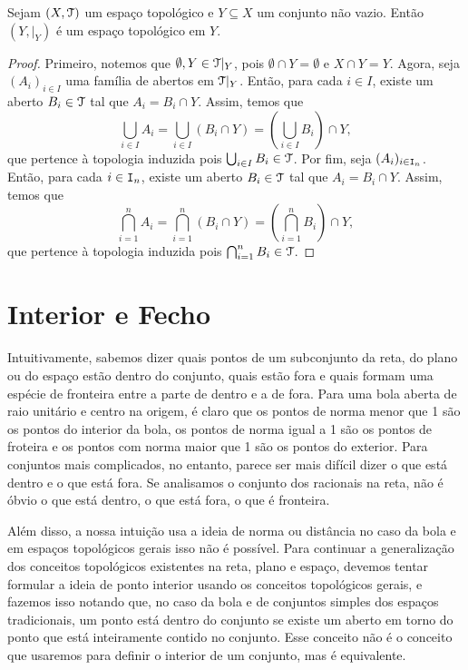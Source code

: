 \begin{prop}
	Sejam $(X,\mathcal{T})$ um espaço topológico e $Y \subseteq X$ um conjunto não vazio. Então $(Y,\mathcal|_Y)$ é um espaço topológico em $Y$.
\end{prop}
\begin{proof}
	Primeiro, notemos que $\emptyset,Y \in \mathcal{T}|_Y$, pois $\emptyset \cap Y = \emptyset$ e $X \cap Y = Y$. Agora, seja $(A_i)_{i \in I}$ uma família de abertos em $\mathcal{T}|_Y$. Então, para cada $i \in I$, existe um aberto $B_i \in \mathcal{T}$ tal que $A_i = B_i \cap Y$. Assim, temos que
	\begin{equation*}
	\bigcup_{i \in I} A_i = \bigcup_{i \in I} (B_i \cap Y) = \left( \bigcup_{i \in I} B_i \right) \cap Y,
	\end{equation*}
que pertence à topologia induzida pois $\bigcup_{i \in I} B_i \in \mathcal{T}$. Por fim, seja $(A_i)_{i \in \mathtt I_n}$. Então, para cada $i \in \mathtt I_n$, existe um aberto $B_i \in \mathcal{T}$ tal que $A_i = B_i \cap Y$. Assim, temos que
	\begin{equation*}
	\bigcap_{i=1}^n A_i = \bigcap_{i=1}^n (B_i \cap Y) = \left( \bigcap_{i=1}^n B_i \right) \cap Y,
	\end{equation*}
que pertence à topologia induzida pois $\bigcap_{i=1}^n B_i \in \mathcal{T}$.
\end{proof}



\section{Interior e Fecho}

	Intuitivamente, sabemos dizer quais pontos de um subconjunto da reta, do plano ou do espaço estão dentro do conjunto, quais estão fora e quais formam uma espécie de fronteira entre a parte de dentro e a de fora. Para uma bola aberta de raio unitário e centro na origem, é claro que os pontos de norma menor que 1 são os pontos do interior da bola, os pontos de norma igual a 1 são os pontos de froteira e os pontos com norma maior que 1 são os pontos do exterior. Para conjuntos mais complicados, no entanto, parece ser mais difícil dizer o que está dentro e o que está fora. Se analisamos o conjunto dos racionais na reta, não é óbvio o que está dentro, o que está fora, o que é fronteira.
	
	Além disso, a nossa intuição usa a ideia de norma ou distância no caso da bola e em espaços topológicos gerais isso não é possível. Para continuar a generalização dos conceitos topológicos existentes na reta, plano e espaço, devemos tentar formular a ideia de ponto interior usando os conceitos topológicos gerais, e fazemos isso notando que, no caso da bola e de conjuntos simples dos espaços tradicionais, um ponto está dentro do conjunto se existe um aberto em torno do ponto que está inteiramente contido no conjunto. Esse conceito não é o conceito que usaremos para definir o interior de um conjunto, mas é equivalente.
	
